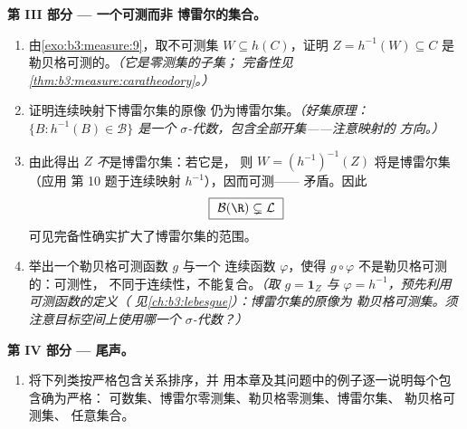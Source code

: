 \begin{problem}
\medskip
\noindent\textbf{第 III 部分 --- 一个可测而非
博雷尔的集合。}
\begin{enumerate}[resume]
  \item 由\cref{exo:b3:measure:9}，取不可测集 $W
        \subseteq h(C)$，证明 $Z = h^{-1}(W) \subseteq C$
        是勒贝格可测的。\emph{（它是零测集的子集；
        完备性见\cref{thm:b3:measure:caratheodory}。）}
  \item 证明连续映射下博雷尔集的原像
        仍为博雷尔集。\emph{（好集原理：
        $\{B : h^{-1}(B) \in \mathcal B\}$ 是一个
        $\sigma$-代数，包含全部开集——注意映射的
        方向。）}
  \item 由此得出 $Z$ \emph{不}是博雷尔集：若它是，
        则 $W = (h^{-1})^{-1}(Z)$ 将是博雷尔集（应用
        第 10 题于连续映射 $h^{-1}$），因而可测——
        矛盾。因此
        \[
        \boxed{\ \mathcal B(\R) \subsetneq \mathcal L\ }
        \]
        可见完备性确实扩大了博雷尔集的范围。
  \item 举出一个勒贝格可测函数 $g$ 与一个
        连续函数 $\varphi$，使得 $g \circ
        \varphi$ 不是勒贝格可测的：可测性，
        不同于连续性，不能复合。\emph{（取 $g =
        \mathbf 1_Z$ 与 $\varphi = h^{-1}$，预先利用
        可测函数的定义（
        见\cref{ch:b3:lebesgue}）：博雷尔集的原像为
        勒贝格可测集。须注意目标空间上使用哪一个
        $\sigma$-代数？）}
\end{enumerate}

\medskip
\noindent\textbf{第 IV 部分 --- 尾声。}
\begin{enumerate}[resume]
  \item 将下列类按严格包含关系排序，并
        用本章及其问题中的例子逐一说明每个包含确为严格：
        可数集、博雷尔零测集、勒贝格零测集、博雷尔集、
        勒贝格可测集、
        任意集合。
\end{enumerate}


\end{problem}
